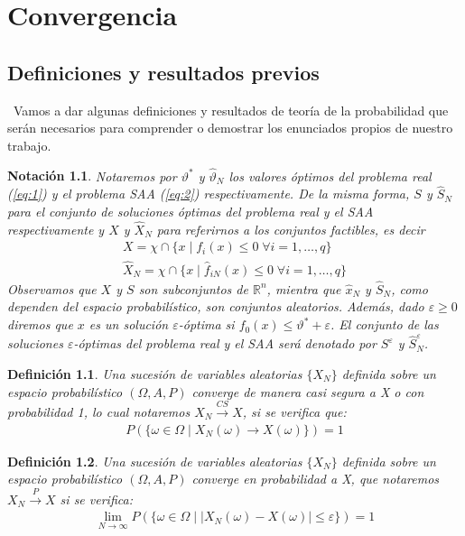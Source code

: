 \documentclass[twoside,a4paper,openright,12pt]{book}
\newtheorem{defi}{Definici\'on}[section]
\newtheorem{notac}{Notación}[section]
\providecommand{\abs}[1]{\left|{#1}\right|}
\providecommand{\conv}[1]{\overset{#1}{\longrightarrow}}
\providecommand{\convcs}{\xrightarrow{CS}}
\newcommand{\R}{\mathbb{R}}
\begin{document}
\chapter{Convergencia}

\section{Definiciones y resultados previos}
\
Vamos a dar algunas definiciones y resultados de teoría de la probabilidad que serán necesarios para comprender o demostrar los enunciados propios de nuestro trabajo.
\begin{notac}
Notaremos por $\vartheta^*$ y $\hat{\vartheta}_N$ los valores óptimos del problema real (\ref{eq:1}) y el problema SAA (\ref{eq:2}) respectivamente. De la misma forma, $S$ y $\hat{S}_N$ para el conjunto de soluciones óptimas del problema real y el SAA respectivamente y $X$ y $\hat{X}_N$ para referirnos a los conjuntos factibles, es decir
\begin{gather*}
X=\chi\cap\{x\mid f_i(x)\leq 0 \;\forall i=1,\dotsc,q\}\\
\hat{X}_N=\chi\cap\{x\mid \hat{f}_{iN}(x)\leq 0 \;\forall i=1,\dotsc,q\}
\end{gather*} 
Observamos que $X$ y $S$ son subconjuntos de $\R^n$, mientra que $\hat{x}_N$ y $\hat{S}_N$, como dependen del espacio probabilístico, son conjuntos aleatorios.
 Además, dado $\varepsilon\geq 0$ diremos que $x$ es un solución $\varepsilon$-óptima si $f_0(x)\leq \vartheta^*+\varepsilon$. El conjunto de las soluciones $\varepsilon$-óptimas del problema real y el SAA será denotado por $S^\varepsilon$ y $\hat{S}^\varepsilon_N$.
\end{notac}
\begin{defi}
Una sucesión de variables aleatorias $\{X_N\}$ definida sobre un espacio probabilístico $(\Omega,A,P)$ converge de manera casi segura a X o con probabilidad 1, lo cual notaremos $X_N \convcs X$, si se verifica que:
\begin{gather*}
P\left(\{\omega\in\Omega \mid X_N(\omega)\longrightarrow X(\omega)\}\right)=1
\end{gather*}
\end{defi}
\begin{defi}
Una sucesión de variables aleatorias $\{X_N\}$ definida sobre un espacio probabilístico $(\Omega,A,P)$ converge en probabilidad a X, que notaremos ${X_N \conv{P} X}$ si se verifica:
\begin{gather*}
\lim_{N\to\infty}P\left(\{\omega\in\Omega \mid \abs{X_N(\omega)-X(\omega)}\leq \varepsilon \}\right)=1
\end{gather*}
\end{defi}
\end{document}
